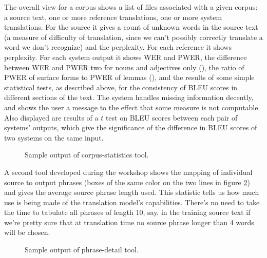 \documentclass[11pt]{book}
\theoremstyle{plain}
\begin{document}
The overall view for a corpus shows a list of files associated with a given corpus: a source text, one or more reference translations, one or more system translations. For the source it gives a count of unknown words in the source text (a measure of difficulty of translation, since we can't possibly correctly translate a word we don't recognize) and the perplexity. For each reference it shows perplexity. For each system output it shows WER and PWER, the difference between WER and PWER two for nouns and adjectives only (\cite{errMeasures}), the ratio of PWER of surface forms to PWER of lemmas (\cite{errMeasures}), and the results of some simple statistical tests, as described above, for the consistency of BLEU scores in different sections of the text. The system handles missing information decently, and shows the user a message to the effect that some measure is not computable. Also displayed are results of a $t$ test on BLEU scores between each pair of systems' outputs, which give the significance of the difference in BLEU scores of two systems on the same input.

\begin{figure}[h]
\centering
\caption{Sample output of corpus-statistics tool.}
\label{fig:sentence_by_sentence_screenshot}
\end{figure}

A second tool developed during the workshop shows the mapping of individual source to output phrases (boxes of the same color on the two lines in figure \ref{fig:phrases_used_screenshot}) and gives the average source phrase length used. This statistic tells us how much use is being made of the translation model's capabilities. There's no need to take the time to tabulate all phrases of length 10, say, in the training source text if we're pretty sure that at translation time no source phrase longer than 4 words will be chosen.

\begin{figure}[h]
\centering
\caption{Sample output of phrase-detail tool.}
\label{fig:phrases_used_screenshot}
\end{figure}
\end{document}
